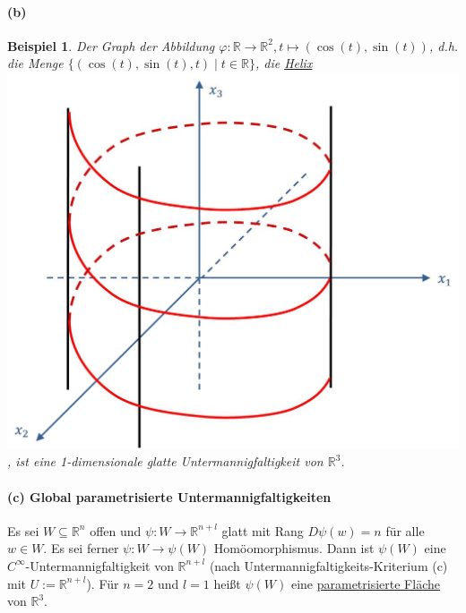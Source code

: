 \documentclass[a4paper,11pt,notitlepage]{report}
\newtheorem{example}{Beispiel}[chapter]
\newcommand{\R}{{\ensuremath{\mathbb{R}}}}
\begin{document}
\paragraph{(b)}
\begin{example}
	Der Graph der Abbildung $\varphi \colon \R \rightarrow \R^2, t \mapsto (\cos{(t)},\sin{(t)})$, d.h. die Menge $\{(\cos{(t)},\sin{(t)},t) \mid t \in \R\}$, die \underline{Helix}
	\includegraphics[scale=0.4]{images/Helix.jpg}, ist eine 1-dimensionale glatte Untermannigfaltigkeit von $\R^3$.
\end{example}

\paragraph{(c) Global parametrisierte Untermannigfaltigkeiten}
Es sei $W \subseteq \R^n$ offen und $\psi \colon W \rightarrow \R^{n+l}$ glatt mit Rang $D\psi(w)=n$ für alle $w \in W$. Es sei ferner $\psi \colon W \rightarrow \psi(W)$ Homöomorphismus.
Dann ist $\psi(W)$ eine $C^\infty$-Untermannigfaltigkeit von $\R^{n+l}$ (nach Untermannigfaltigkeits-Kriterium (c) mit $U := \R^{n+l}$).
\newline
Für $n=2$ und $l=1$ heißt $\psi(W)$ eine \underline{parametrisierte Fläche} von $\R^3$.
\end{document}
